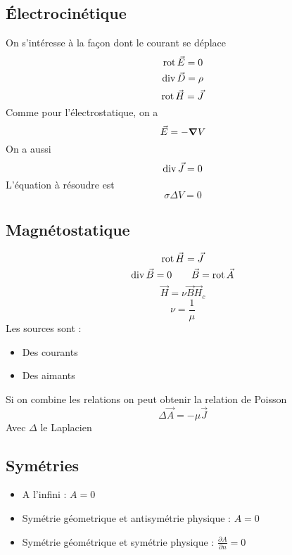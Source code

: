 \documentclass[resume]{subfiles}
\begin{document}
\subsection{Électrocinétique}
On s'intéresse à la façon dont le courant se déplace
$$\operatorname{rot}\vec{E}=0$$
$$\operatorname{div}\vec{D}=\rho$$
$$\operatorname{rot}\vec{H}=\vec{J}$$
Comme pour l'électrostatique, on a
$$\vec{E}=-\grad V$$
On a aussi
$$\operatorname{div}\vec{J}=0$$
L'équation à résoudre est
$$\sigma \Delta V=0$$
\subsection{Magnétostatique}
$$\operatorname{rot}\vec{H}=\vec{J}$$
$$\operatorname{div}\vec{B}=0\qquad \vec{B}=\operatorname{rot}\vec{A}$$
$$\vec{H}=\nu\vec{B}\vec{H}_c$$
$$\nu=\frac{1}{\mu}$$
Les sources sont :
\begin{itemize}
\item Des courants
\item Des aimants
\end{itemize}
Si on combine les relations on peut obtenir la relation de Poisson
$$\Delta \vec{A}=-\mu \vec{J}$$
Avec $\Delta$ le Laplacien
\subsection{Symétries}
\begin{itemize}
\item A l'infini : $A=0$
\item Symétrie géometrique et antisymétrie physique : $A=0$
\item Symétrie géométrique et symétrie physique : $\frac{\partial A}{\partial n}=0$
\end{itemize}
\end{document}
